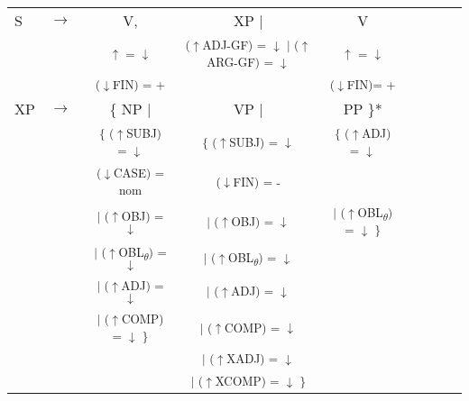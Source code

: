 \documentclass[12pt,a4paper]{article}
\begin{document}
\begin{singlespace}
\begin{tabular}{ l  l  c  c  c  c  c  c  c}
S & $\rightarrow$ & V, & XP $\mid$ & V \\
   & $\qquad$ & \textsuperscript{$\uparrow$ = $\downarrow$} & \textsuperscript{($\uparrow$ADJ-GF) = $\downarrow$ $\mid$ ($\uparrow$ARG-GF) = $\downarrow$} &  \textsuperscript{$\uparrow$ = $\downarrow$} \\
      & $\qquad$ & \textsuperscript{($\downarrow$FIN) = +} & &  \textsuperscript{($\downarrow$FIN)= +} \\
XP & $\rightarrow$ & \{ NP $\mid$ &  VP $\mid$ & PP \}* \\
   & $\qquad$ & \textsuperscript{\{ ($\uparrow$SUBJ) = $\downarrow$} &\textsuperscript{\{ ($\uparrow$SUBJ) = $\downarrow$} & \textsuperscript{\{ ($\uparrow$ADJ) = $\downarrow$} \\
    & $\qquad$ & \textsuperscript{($\downarrow$CASE) = nom} & \textsuperscript{($\downarrow$FIN) = -} &  \\
    & $\qquad$ & \textsuperscript{$\mid$ ($\uparrow$OBJ) = $\downarrow$} & \textsuperscript{$\mid$ ($\uparrow$OBJ) = $\downarrow$} &  \textsuperscript{$\mid$ ($\uparrow$OBL\textsubscript{$\theta$}) = $\downarrow$ \}} \\
       & $\qquad$ & \textsuperscript{$\mid$ ($\uparrow$OBL\textsubscript{$\theta$}) = $\downarrow$} & \textsuperscript{$\mid$ ($\uparrow$OBL\textsubscript{$\theta$}) = $\downarrow$} & \\
         & $\qquad$ & \textsuperscript{$\mid$ ($\uparrow$ADJ) = $\downarrow$} & \textsuperscript{$\mid$ ($\uparrow$ADJ) = $\downarrow$} &  \\
           & $\qquad$ & \textsuperscript{$\mid$ ($\uparrow$COMP) = $\downarrow$ \}} & \textsuperscript{$\mid$ ($\uparrow$COMP) = $\downarrow$} &  \\
             & $\qquad$ & & \textsuperscript{$\mid$ ($\uparrow$XADJ) = $\downarrow$} &  \\
               & $\qquad$ & & \textsuperscript{$\mid$ ($\uparrow$XCOMP) = $\downarrow$ \} } &  \\

\end{tabular}
\end{singlespace}
\end{document}
